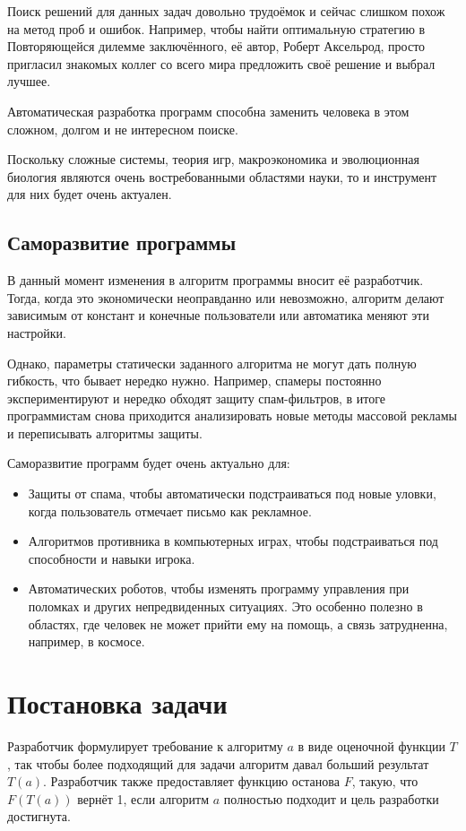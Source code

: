 \documentclass[utf8,a5paper,portrait,10pt,twoside]{eskdtext}
\begin{document}
Поиск решений для данных задач довольно трудоёмок и сейчас слишком похож на
метод проб и ошибок. Например, чтобы найти оптимальную стратегию в Повторяющейся
дилемме заключённого, её автор, Роберт Аксельрод, просто пригласил знакомых
коллег со всего мира предложить своё решение и выбрал лучшее.\cite{dilemma}

Автоматическая разработка программ способна заменить человека в этом сложном,
долгом и не интересном поиске.

Поскольку сложные системы, теория игр, макроэкономика и эволюционная биология
являются очень востребованными областями науки, то и инструмент для них будет
очень актуален.

\subsection{Саморазвитие программы}

В данный момент изменения в алгоритм программы вносит её разработчик. Тогда,
когда это экономически неоправданно или невозможно, алгоритм делают зависимым
от констант и конечные пользователи или автоматика меняют эти настройки.

Однако, параметры статически заданного алгоритма не могут дать полную гибкость,
что бывает нередко нужно. Например, спамеры постоянно экспериментируют и нередко
обходят защиту спам-фильтров, в итоге программистам снова приходится
анализировать новые методы массовой рекламы и переписывать алгоритмы защиты.

Саморазвитие программ будет очень актуально для:
\begin{itemize}
  \item Защиты от спама, чтобы автоматически подстраиваться под новые уловки,
        когда пользователь отмечает письмо как рекламное.
  \item Алгоритмов противника в компьютерных играх, чтобы подстраиваться под
        способности и навыки игрока.
  \item Автоматических роботов, чтобы изменять программу управления при
        поломках и других непредвиденных ситуациях.\cite{damage} Это особенно
        полезно в областях, где человек не может прийти ему на помощь, а связь
        затрудненна, например, в космосе.
\end{itemize}

\newpage
\section{Постановка задачи}
Разработчик формулирует требование к алгоритму $a$ в виде оценочной
функции $T$, так чтобы более подходящий для задачи алгоритм давал больший
результат $T(a)$. Разработчик также предоставляет функцию останова $F$, такую,
что $F(T(a))$ вернёт 1, если алгоритм $a$ полностью подходит и цель разработки
достигнута.
\end{document}
